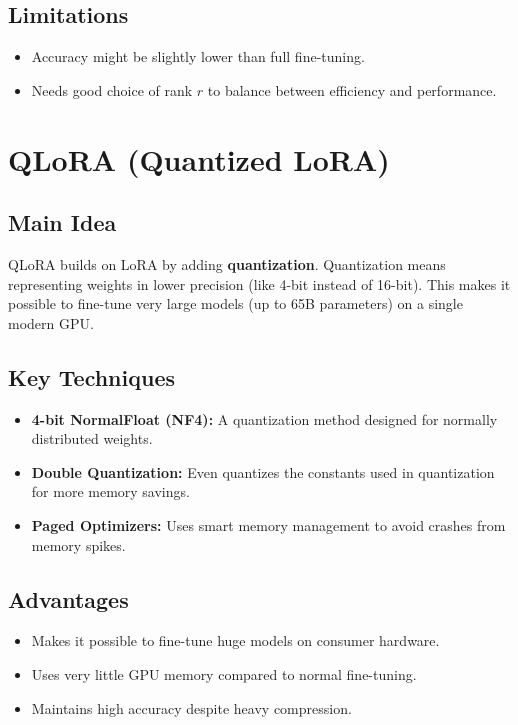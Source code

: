 \documentclass[11pt]{article}
\begin{document}
\subsection{Limitations}
\begin{itemize}
    \item Accuracy might be slightly lower than full fine-tuning.
    \item Needs good choice of rank $r$ to balance between efficiency and performance.
\end{itemize}

\section{QLoRA (Quantized LoRA)}
\subsection{Main Idea}
QLoRA builds on LoRA by adding \textbf{quantization}. 
Quantization means representing weights in lower precision (like 4-bit instead of 16-bit). 
This makes it possible to fine-tune very large models (up to 65B parameters) on a single modern GPU.

\subsection{Key Techniques}
\begin{itemize}
    \item \textbf{4-bit NormalFloat (NF4):} A quantization method designed for normally distributed weights.
    \item \textbf{Double Quantization:} Even quantizes the constants used in quantization for more memory savings.
    \item \textbf{Paged Optimizers:} Uses smart memory management to avoid crashes from memory spikes.
\end{itemize}

\subsection{Advantages}
\begin{itemize}
    \item Makes it possible to fine-tune huge models on consumer hardware.
    \item Uses very little GPU memory compared to normal fine-tuning.
    \item Maintains high accuracy despite heavy compression.
\end{itemize}
\end{document}
